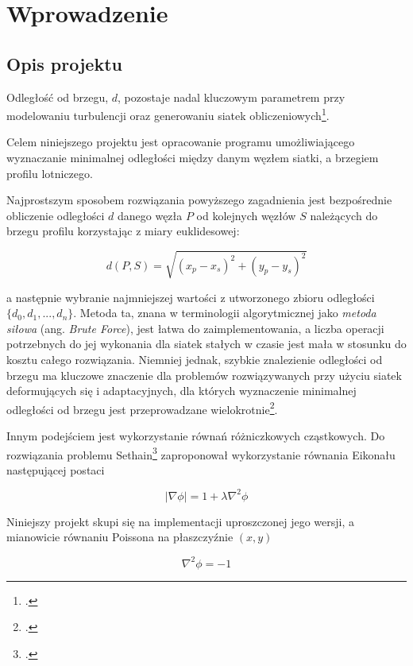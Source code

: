\chapter{Wprowadzenie}
\section{Opis projektu}

\indent\indent Odległość od brzegu, $d$, pozostaje nadal kluczowym parametrem przy modelowaniu turbulencji oraz generowaniu siatek obliczeniowych\footcite{Tucker}.

\indent Celem niniejszego projektu jest opracowanie programu  umożliwiającego wyznaczanie minimalnej odległości między danym węzłem siatki, a brzegiem profilu lotniczego.
 
Najprostszym sposobem rozwiązania powyższego zagadnienia jest  bezpośrednie obliczenie odległości $d$ danego węzła $P$ od kolejnych węzłów $S$ należących do brzegu profilu korzystając z miary euklidesowej:

\begin{equation}
d(P,S)= \sqrt{(x_p-x_s)^2 + (y_p-y_s)^2}
\end{equation}

\noindent a następnie wybranie najmniejszej wartości z utworzonego zbioru odległości $\{d_0, d_1, ..., d_n\}$. Metoda ta, znana w terminologii algorytmicznej jako \textit{metoda siłowa} (ang. \textit{Brute Force}), jest łatwa do zaimplementowania, a liczba operacji potrzebnych do jej wykonania dla siatek stałych w czasie jest mała w stosunku do kosztu całego rozwiązania. Niemniej jednak, szybkie znalezienie odległości od brzegu ma kluczowe znaczenie dla problemów rozwiązywanych przy użyciu siatek deformujących się i adaptacyjnych, dla których wyznaczenie minimalnej odległości od brzegu jest przeprowadzane wielokrotnie\footcite{Ibid}. 

Innym podejściem jest wykorzystanie równań różniczkowych cząstkowych. Do rozwiązania problemu Sethain\footcite{Sethain} zaproponował wykorzystanie równania Eikonału następującej postaci

\begin{equation}
\label{eq:eikonal}
\left|\nabla \phi\right|=1+\lambda\nabla^2\phi
\end{equation}

\newpage
\indent Niniejszy projekt skupi się na implementacji uproszczonej  jego wersji, a mianowicie równaniu Poissona na płaszczyźnie $(x,y)$

\begin{equation}
\nabla^2\phi = - 1
\end{equation}

